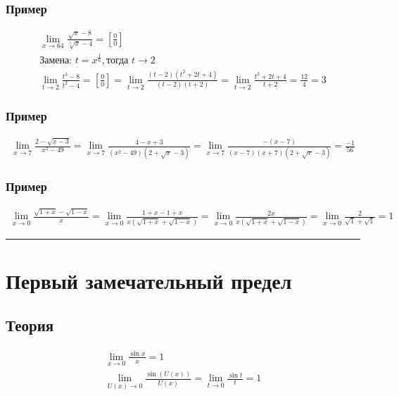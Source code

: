 \documentclass{article}
\begin{document}
\subsubsection{Пример}
\begin{gather*}
    \lim_{x \to 64} \frac{\sqrt{x} - 8}{\sqrt[3]{x} - 4} =
    \left[ \frac{0}{0} \right] \\
    \text{Замена: } t = x^{\frac{1}{6}}, \text{тогда } t \to 2 \\
    \lim_{t \to 2} \frac{t^3 - 8}{t^2 - 4} = 
    \left[ \frac{0}{0} \right] =
    \lim_{t \to 2} \frac{(t - 2)(t^2 + 2t + 4)}{(t - 2)(t + 2)} =
    \lim_{t \to 2} \frac{t^2 + 2t + 4}{t + 2} =
    \frac{12}{4} = 3
\end{gather*}

\subsubsection{Пример}
\begin{gather*}
    \lim_{x \to 7} \frac{2 - \sqrt{x - 3}}{x^2 - 49} =
    \lim_{x \to 7} \frac{4 - x + 3}{(x^2 - 49)(2 + \sqrt{x} - 3)} =
    \lim_{x \to 7} \frac{-(x - 7)}{(x - 7)(x + 7)(2 + \sqrt{x} - 3)} = \frac{-1}{56}
\end{gather*}

\subsubsection{Пример}
\begin{gather*}
    \lim_{x \to 0} \frac{\sqrt{1 + x} - \sqrt{1 - x}}{x} =
    \lim_{x \to 0} \frac{1 + x - 1 + x}{x \left( \sqrt{1 + x} + \sqrt{1 - x} \right)} =
    \lim_{x \to 0} \frac{2x}{x \left( \sqrt{1 + x} + \sqrt{1 - x} \right)} =
    \lim_{x \to 0} \frac{2}{\sqrt{1} + \sqrt{1}} = 1
\end{gather*}



\par\noindent\rule{\textwidth}{1pt}
\section{Первый замечательный предел}

\subsection{Теория}
\begin{gather*}
    \lim_{x \to 0} \frac{\sin x}{x} = 1 \\
    \lim_{U(x) \to 0} \frac{\sin (U(x))}{U(x)} = 
    \lim_{t \to 0} \frac{\sin t}{t} = 1
\end{gather*}
\end{document}
